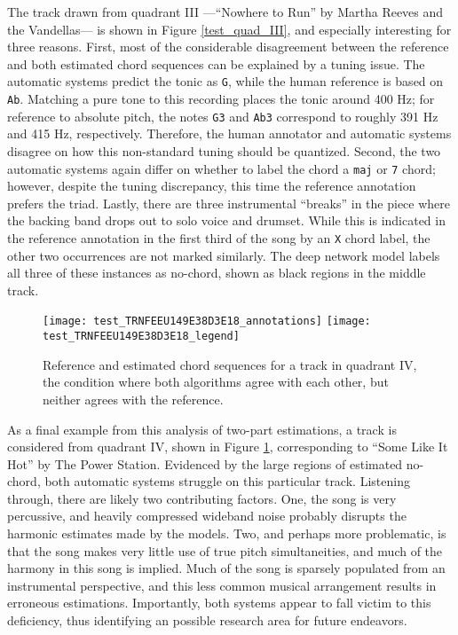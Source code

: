 The track drawn from quadrant III ---``Nowhere to Run'' by Martha Reeves and the Vandellas--- is shown in Figure \ref{test_quad_III}, and especially interesting for three reasons.
First, most of the considerable disagreement between the reference and both estimated chord sequences can be explained by a tuning issue.
The automatic systems predict the tonic as \texttt{G}, while the human reference is based on \texttt{Ab}.
Matching a pure tone to this recording places the tonic around 400 Hz;
for reference to absolute pitch, the notes \texttt{G3} and \texttt{Ab3} correspond to roughly 391 Hz and 415 Hz, respectively.
Therefore, the human annotator and automatic systems disagree on how this non-standard tuning should be quantized.
Second, the two automatic systems again differ on whether to label the chord a \texttt{maj} or \texttt{7} chord; however, despite the tuning discrepancy, this time the reference annotation prefers the triad.
Lastly, there are three instrumental ``breaks'' in the piece where the backing band drops out to solo voice and drumset.
While this is indicated in the reference annotation in the first third of the song by an \texttt{X} chord label, the other two occurrences are not marked similarly.
The deep network model labels all three of these instances as no-chord, shown as black regions in the middle track.


\begin{figure}[t]
\centering
\texttt{[image: test\_TRNFEEU149E38D3E18\_annotations]}
\texttt{[image: test\_TRNFEEU149E38D3E18\_legend]}
\caption{Reference and estimated chord sequences for a track in quadrant IV, the condition where both algorithms agree with each other, but neither agrees with the reference.}
\label{fig:test_quadIV}
\end{figure}

As a final example from this analysis of two-part estimations, a track is considered from quadrant IV, shown in Figure \ref{fig:test_quadIV}, corresponding to ``Some Like It Hot'' by The Power Station.
Evidenced by the large regions of estimated no-chord, both automatic systems struggle on this particular track.
Listening through, there are likely two contributing factors.
One, the song is very percussive, and heavily compressed wideband noise probably disrupts the harmonic estimates made by the models.
Two, and perhaps more problematic, is that the song makes very little use of true pitch simultaneities, and much of the harmony in this song is implied.
Much of the song is sparsely populated from an instrumental perspective, and this less common musical arrangement results in erroneous estimations.
Importantly, both systems appear to fall victim to this deficiency, thus identifying an possible research area for future endeavors.






